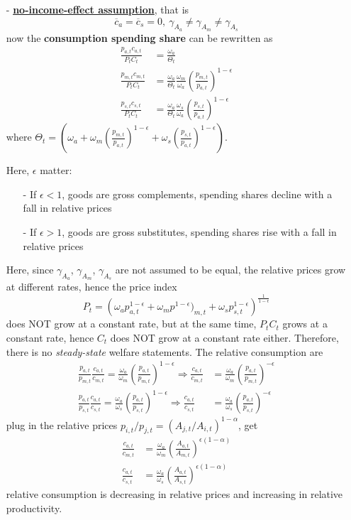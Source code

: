 \documentclass[10pt,landscape,a4paper]{article}
\let\bar\overline
\begin{document}
\begin{multicols*}{3}
\begin{itemize}
    \item[-] \underline{\textbf{no-income-effect assumption}}, that is 
    $$
    \bar{c}_a=\bar{c}_s= 0,\ \gamma_{A_a}\neq\gamma_{A_m}\neq \gamma_{A_s}
    $$
    now the \textbf{consumption spending share} can be rewritten as
    \begin{align*}
    \frac{p_{a,t}c_{a,t}}{P_tC_t}&=\frac{\omega_a}{\Theta_t} \\
    \frac{p_{m,t}c_{m,t}}{P_tC_t}&=\frac{\omega_a}{\Theta_t}\frac{\omega_m}{\omega_a} \left(\frac{p_{m,t}}{p_{a,t}}\right)^{1-\epsilon}\\
    \frac{p_{s,t}c_{s,t}}{P_tC_t}&=\frac{\omega_a}{\Theta_t}\frac{\omega_s}{\omega_a} \left(\frac{p_{s,t}}{p_{a,t}}\right)^{1-\epsilon}
\end{align*}
where $\Theta_t = \left( \omega_a+\omega_m\left(\frac{p_{m,t}}{p_{a,t}}\right)^{1-\epsilon} +\omega_s\left(\frac{p_{s,t}}{p_{a,t}}\right)^{1-\epsilon}\right)$.

Here, $\epsilon$ matter:
\begin{itemize}
    \item[-] If $\epsilon<1$, goods are gross complements, spending shares decline with a fall in relative prices
    \item[-] If $\epsilon>1$, goods are gross substitutes, spending shares rise with a fall in relative prices
\end{itemize}

Here, since $\gamma_{A_a}$, $\gamma_{A_m}$, $\gamma_{A_s}$ are not assumed to be equal, the relative prices grow at different rates, hence the price index
$$
P_t = \left( \omega_a p^{1-\epsilon}_{a,t}+\omega_m p^{1-\epsilon})_{m,t}+\omega_s p^{1-\epsilon}_{s,t} \right)^{\frac{1}{1-\epsilon}}
$$
does NOT grow at a constant rate, but at the same time, $P_tC_t$ grows at a constant rate, hence $C_t$ does NOT grow at a constant rate either. Therefore, there is no \textit{steady-state} welfare statements. The relative consumption are
\begin{align*}
    \frac{p_{a,t}}{p_{m,t}}\frac{c_{a,t}}{c_{m,t}} = \frac{\omega_a}{\omega_m}\left(\frac{p_{a,t}}{p_{m,t}}\right)^{1-\epsilon} \Rightarrow \frac{c_{a,t}}{c_{m,t}} &= \frac{\omega_a}{\omega_m}\left(\frac{p_{a,t}}{p_{m,t}}\right)^{-\epsilon}\\
    \frac{p_{a,t}}{p_{s,t}}\frac{c_{a,t}}{c_{s,t}} = \frac{\omega_a}{\omega_s}\left(\frac{p_{a,t}}{p_{s,t}}\right)^{1-\epsilon} \Rightarrow \frac{c_{a,t}}{c_{s,t}} &= \frac{\omega_a}{\omega_s}\left(\frac{p_{a,t}}{p_{s,t}}\right)^{-\epsilon}
\end{align*}
plug in the relative prices $p_{i,t}/p_{j,t}=\left(A_{j,t}/A_{i,t}\right)^{1-\alpha}$, get 
\begin{align*}
\frac{c_{a,t}}{c_{m,t}} & = \frac{\omega_a}{\omega_m}\left(\frac{A_{a,t}}{A_{m,t}}\right)^{\epsilon(1-\alpha)}\\
    \frac{c_{a,t}}{c_{s,t}} & = \frac{\omega_a}{\omega_s}\left(\frac{A_{a,t}}{A_{s,t}}\right)^{\epsilon(1-\alpha)}
\end{align*}
relative consumption is decreasing in relative prices and increasing in relative productivity.


\end{itemize}
\end{multicols*}
\end{document}
